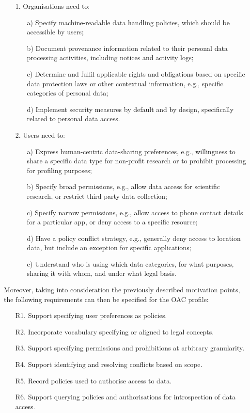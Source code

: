 \begin{itemize}
  \item[1.]Organisations need to:
    \begin{itemize}
      \item[a)]Specify machine-readable data handling policies, which should be accessible by users;
      \item[b)]Document provenance information related to their personal data processing activities, including notices and activity logs;
      \item[c)]Determine and fulfil applicable rights and obligations based on specific data protection laws or other contextual information, e.g., specific categories of personal data;
      \item[d)]Implement security measures by default and by design, specifically related to personal data access.
    \end{itemize}

    \item[2.]Users need to:
    \begin{itemize}
      \item[a)]Express human-centric data-sharing preferences, e.g., willingness to share a specific data type for non-profit research or to prohibit processing for profiling purposes;
      \item[b)]Specify broad permissions, e.g., allow data access for scientific research, or restrict third party data collection;
      \item[c)]Specify narrow permissions, e.g., allow access to phone contact details for a particular app, or deny access to a specific resource;
      \item[d)]Have a policy conflict strategy, e.g., generally deny access to location data, but include an exception for specific applications;
      \item[e)]Understand who is using which data categories, for what purposes, sharing it with whom, and under what legal basis.
    \end{itemize}
    
\end{itemize}

Moreover, taking into consideration the previously described motivation points, the following requirements can then be specified for the OAC profile:

\begin{itemize}
      \item[R1.]Support specifying user preferences as policies.
      \item[R2.]Incorporate vocabulary specifying or aligned to legal concepts.
      \item[R3.]Support specifying permissions and prohibitions at arbitrary granularity.
      \item[R4.]Support identifying and resolving conflicts based on scope.
      \item[R5.]Record policies used to authorise access to data.
      \item[R6.]Support querying policies and authorisations for introspection of data access.
\end{itemize}

